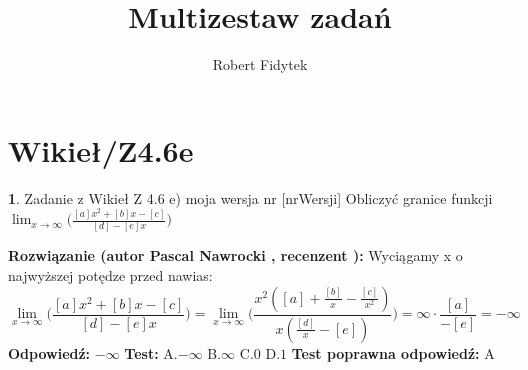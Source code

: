 \documentclass[12pt, a4paper]{article}
\title{Multizestaw zadań}
\author{Robert Fidytek}
\date{}
\theoremstyle{definition} %
\newtheorem{zad}{}
\newcommand{\kategoria}[1]{\section{#1}} %
\newcommand{\zadStart}[1]{\begin{zad}#1\newline} %
\newcommand{\zadStop}{\end{zad}}   %
\newcommand{\rozwStart}[2]{\noindent \textbf{Rozwiązanie (autor #1 , recenzent #2): }\newline} %
\newcommand{\rozwStop}{\newline}                                            %
\newcommand{\odpStart}{\noindent \textbf{Odpowiedź:}\newline}    %
\newcommand{\odpStop}{\newline}                                             %
\newcommand{\testStart}{\noindent \textbf{Test:}\newline} %
\newcommand{\testStop}{\newline} %
\newcommand{\kluczStart}{\noindent \textbf{Test poprawna odpowiedź:}\newline} %
\newcommand{\kluczStop}{\newline} %
\begin{document}
\maketitle


\kategoria{Wikieł/Z4.6e}
\zadStart{Zadanie z Wikieł Z 4.6 e) moja wersja nr [nrWersji]}
Obliczyć granice funkcji $\displaystyle{\lim_{x \to \infty}}\bigg(\frac{[a]x^2+[b]x-[c]}{[d]-[e]x}\bigg)$
\zadStop
\rozwStart{Pascal Nawrocki}{}
Wyciągamy x o najwyższej potędze przed nawias:
$$\displaystyle{\lim_{x \to \infty}}\bigg(\frac{[a]x^2+[b]x-[c]}{[d]-[e]x}\bigg)=\displaystyle{\lim_{x \to \infty}}\bigg(\frac{x^2([a]+\frac{[b]}{x}-\frac{[c]}{x^2})}{x(\frac{[d]}{x}-[e])}\bigg)=\infty\cdot\frac{[a]}{-[e]}=-\infty$$
\rozwStop
\odpStart
$-\infty$
\odpStop
\testStart
A.$-\infty$
B.$\infty$
C.$0$
D.$1$
\testStop
\kluczStart
A
\kluczStop
\end{document}
